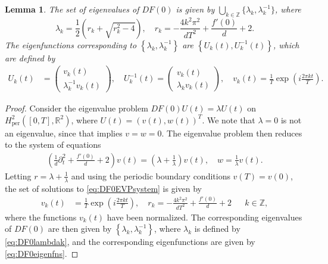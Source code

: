 \documentclass[12pt,reqno]{amsart}
\def\R{{\mathbb R}}
\def\Z{{\mathbb Z}}
\def\per{\textrm{per}}
\newtheorem{lemma}{Lemma}
\begin{document}
\begin{lemma}\label{lemma:DF0eigs}
The set of eigenvalues of $DF(0)$ is given by $\bigcup_{k \in \Z} \{\lambda_k, \lambda_k^{-1} \}$, where 
\begin{equation}\label{eq:DF0lambdak}
\lambda_k = \frac{1}{2}\left( r_k + \sqrt{r_k^2 - 4} \right), \quad r_k = -\frac{4 k^2 \pi^2}{d T^2} + \frac{f'(0)}{d} + 2.
\end{equation}
The eigenfunctions corresponding to $\left\{ \lambda_k, \lambda_k^{-1} \right\}$ are $\left\{ U_k(t), U_k^{-1}(t) \right\}$, which are defined by 
\begin{equation}\label{eq:DF0eigenfns}
\begin{aligned}
U_k(t) &= \begin{pmatrix}v_k(t) \\ \lambda_k^{-1}  v_k(t) \end{pmatrix}, \quad
U_k^{-1}(t) = \begin{pmatrix}v_k(t) \\ \lambda_k v_k(t) \end{pmatrix}, \quad
v_k(t) = \frac{1}{T} \exp\left( i \frac{2 \pi k t}{T} \right).
\end{aligned}
\end{equation}
\end{lemma}
\begin{proof}
Consider the eigenvalue problem $DF(0) U(t) = \lambda U(t)$ on $H^2_\per([0,T],\R^2)$, where $U(t) = (v(t), w(t))^T$. We note that $\lambda = 0$ is not an eigenvalue, since that implies $v = w = 0$. The eigenvalue problem then reduces to the system of equations
\begin{align}\label{eq:DF0EVPsystem}
\left( \frac{1}{d}\partial_t^2 + \frac{f'(0)}{d} + 2 \right) v(t) = \left( \lambda + \frac{1}{\lambda} \right) v(t), \quad
w = \frac{1}{\lambda} v(t).
\end{align}
Letting $r = \lambda + \frac{1}{\lambda}$ and using the periodic boundary conditions $v(T) = v(0)$, the set of solutions to \cref{eq:DF0EVPsystem} is given by
\begin{align}
v_k(t) &= \frac{1}{T} \exp\left( i \frac{2 \pi k t}{T} \right), \quad r_k = -\frac{4 k^2 \pi^2}{d T^2} + \frac{f'(0)}{d} + 2 && k \in \Z,
\end{align}
where the functions $v_k(t)$ have been normalized. The corresponding eigenvalues of $DF(0)$ are then given by $\left\{ \lambda_k, \lambda_k^{-1} \right\}$, where $\lambda_k$ is defined by \cref{eq:DF0lambdak}, and the corresponding eigenfunctions are given by \cref{eq:DF0eigenfns}.
\end{proof}
\end{document}
